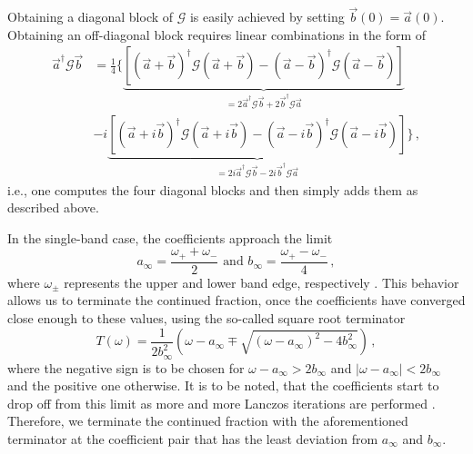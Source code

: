 \documentclass[
    reprint, 
    aps,
    preprintnumbers,
    twocolumn,
    prb,
    superscriptaddress
]{revtex4-2}
\begin{document}
Obtaining a diagonal block of $\mathcal{G}$ is easily achieved by setting $\vec{b}(0) = \vec{a}(0)$.
Obtaining an off-diagonal block requires linear combinations in the form of 
\begin{align}
    \vec{a}^\dagger \mathcal{G} \vec{b} &= \frac{1}{4} \Big\{ 
        \underbrace{\left[ (\vec{a} + \vec{b})^\dagger \mathcal{G} (\vec{a} + \vec{b}) - (\vec{a} - \vec{b})^\dagger \mathcal{G} (\vec{a} - \vec{b}) \right]}_{ = 2 \vec{a}^\dagger \mathcal{G} \vec{b} + 2 \vec{b}^\dagger \mathcal{G} \vec{a}} \\
    &-i \underbrace{\left[ (\vec{a} + i \vec{b})^\dagger \mathcal{G} (\vec{a} + i \vec{b}) - (\vec{a} - i \vec{b})^\dagger \mathcal{G} (\vec{a} - i \vec{b}) \right]}_{= 2i \vec{a}^\dagger \mathcal{G} \vec{b} - 2i \vec{b}^\dagger \mathcal{G} \vec{a}} \Big\}\,, \nonumber
\end{align}
i.e., one computes the four diagonal blocks and then simply adds them as described above.

In the single-band case, the coefficients approach the limit
\begin{equation}
    \label{eqn:inf_lanczos}
    a_\infty = \frac{\omega_+ + \omega_-}{2}\text{  and  } b_\infty = \frac{\omega_+ - \omega_-}{4}\,,
\end{equation}
where $\omega_\pm$ represents the upper and lower band edge, respectively \cite{PettiforRecursion}.
This behavior allows us to terminate the continued fraction, once the coefficients have converged close enough to these values, using the so-called square root terminator
\begin{equation}
    T(\omega) = \frac{1}{2b_\infty^2} \left( \omega - a_\infty \mp \sqrt{(\omega - a_\infty)^2 - 4 b_\infty^2} \right)\,,
\end{equation}
where the negative sign is to be chosen for $\omega - a_\infty > 2b_\infty$ and $|\omega - a_\infty| < 2b_\infty$ and the positive one otherwise.
It is to be noted, that the coefficients start to drop off from this limit as more and more Lanczos iterations are performed \cite{ViswanathRecursion}.
Therefore, we terminate the continued fraction with the aforementioned terminator at the coefficient pair that has the least deviation from $a_\infty$ and $b_\infty$.

\end{document}
